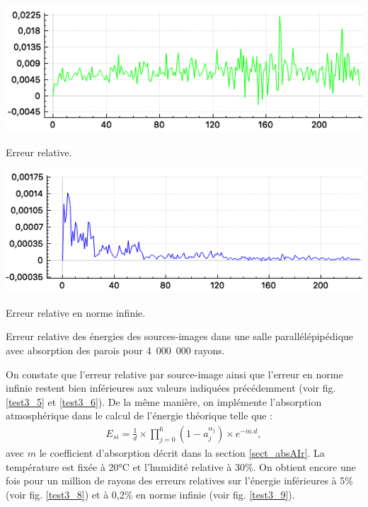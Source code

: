 \begin{figureth}
	\begin{subfigureth}{0.8\textwidth}
		\includegraphics[width=\linewidth]{images/test3_5}
		\caption{Erreur relative.}
		\label{test3_5}
	\end{subfigureth}
	\begin{subfigureth}{0.8\textwidth}
		\includegraphics[width=\linewidth]{images/test3_6}
		\caption{Erreur relative en norme infinie.}
		\label{test3_6}
	\end{subfigureth}
	\caption{Erreur relative des énergies des sources-images dans une salle parallélépipédique avec absorption des parois pour 4~000~000 rayons.}
\end{figureth}


On constate que l'erreur relative par source-image ainsi que l'erreur en norme infinie restent bien inférieures aux valeurs indiquées précédemment (voir fig. \ref{test3_5} et \ref{test3_6}). De la même manière, on implémente l'absorption atmosphérique dans le calcul de l'énergie théorique telle que :
\begin{align}
E_{si} = \frac{1}{d} \times \prod_{j=0}^{6}{(1-a_j^{\alpha_j})} \times e^{-m.d}, 
\end{align}
avec $m$ le coefficient d'absorption décrit dans la section \ref{sect_absAIr}. La température est fixée à 20°C et l'humidité relative à 30\%. On obtient encore une fois pour un million de rayons des erreurs relatives sur l'énergie inférieures à 5\% (voir fig. \ref{test3_8}) et à 0,2\% en norme infinie (voir fig. \ref{test3_9}).


